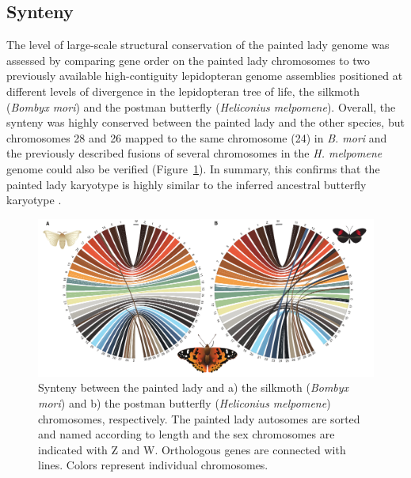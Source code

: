 \documentclass[twocolumn]{bmcart}%
\begin{document}
\subsection*{Synteny}
The level of large-scale structural conservation of the painted lady genome was assessed by comparing gene order on the painted lady chromosomes to two previously available high-contiguity lepidopteran genome assemblies positioned at different levels of divergence in the lepidopteran tree of life, the silkmoth (\textit{Bombyx mori}) and the postman butterfly (\textit{Heliconius melpomene}). Overall, the synteny was highly conserved between the painted lady and the other species, but chromosomes 28 and 26 mapped to the same chromosome (24) in \textit{B. mori} and the previously described fusions of several chromosomes in the \textit{H. melpomene} genome \citep{daveyNoEvidenceMaintenance2017} could also be verified (Figure~\ref{fig:2}). In summary, this confirms that the painted lady karyotype is highly similar to the inferred ancestral butterfly karyotype \citep{aholaGlanvilleFritillaryGenome2014}.

\begin{figure}
    \centering
    \includegraphics[width=1.99\linewidth]{ShipilinaNasvall_All_FIG2_complressed.pdf}
    \caption{Synteny between the painted lady and a) the silkmoth (\textit{Bombyx mori}) and b) the postman butterfly (\textit{Heliconius melpomene}) chromosomes, respectively. The painted lady autosomes are sorted and named according to length and the sex chromosomes are indicated with Z and W. Orthologous genes are connected with lines. Colors represent individual chromosomes.}
    \label{fig:2}
\end{figure}
\end{document}
